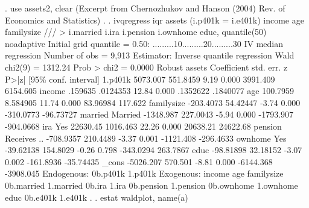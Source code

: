 . use assets2, clear
(Excerpt from Chernozhukov and Hanson (2004) Rev. of Economics and Statistics)
{\smallskip}
. 
. ivqregress iqr assets (i.p401k = i.e401k) income age familysize ///
>         i.married i.ira i.pension i.ownhome educ, quantile(50) noadaptive
{\smallskip}
Initial grid
    quantile = 0.50: .........10.........20.........30
{\smallskip}
IV median regression                                   Number of obs =   9,913
Estimator: Inverse quantile regression                 Wald chi2(9)  = 1312.24
                                                       Prob > chi2   =  0.0000
{\smallskip}
             {\VBAR}               Robust
      assets {\VBAR} Coefficient  std. err.      z    P>|z|     [95\% conf. interval]
     1.p401k {\VBAR}   5073.007   551.8459     9.19   0.000     3991.409    6154.605
      income {\VBAR}    .159635   .0124353    12.84   0.000     .1352622    .1840077
         age {\VBAR}   100.7959   8.584905    11.74   0.000     83.96984     117.622
  familysize {\VBAR}  -203.4073   54.42447    -3.74   0.000    -310.0773   -96.73727
             {\VBAR}
     married {\VBAR}
    Married  {\VBAR}  -1348.987   227.0043    -5.94   0.000    -1793.907   -904.0668
             {\VBAR}
         ira {\VBAR}
        Yes  {\VBAR}   22630.45   1016.463    22.26   0.000     20638.21    24622.68
             {\VBAR}
     pension {\VBAR}
Receives ..  {\VBAR}  -708.9357   210.4489    -3.37   0.001    -1121.408   -296.4633
             {\VBAR}
     ownhome {\VBAR}
        Yes  {\VBAR}  -39.62138   154.8029    -0.26   0.798    -343.0294    263.7867
        educ {\VBAR}  -98.81898   32.18152    -3.07   0.002    -161.8936   -35.74435
       _cons {\VBAR}  -5026.207    570.501    -8.81   0.000    -6144.368   -3908.045
Endogenous: 0b.p401k 1.p401k
 Exogenous: income age familysize 0b.married 1.married 0b.ira 1.ira
            0b.pension 1.pension 0b.ownhome 1.ownhome educ 0b.e401k 1.e401k
{\smallskip}
. 
. estat waldplot, name(a)

